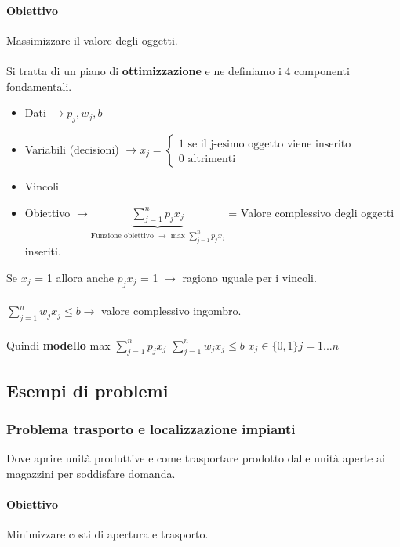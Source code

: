\documentclass[12pt, letterpaper]{article}
\begin{document}
	\paragraph{Obiettivo}Massimizzare il valore degli oggetti.
	\\\\Si tratta di un piano di \textbf{ottimizzazione} e ne definiamo i 4 componenti fondamentali.
	\\\begin{itemize}
		\item Dati $\rightarrow p_j, w_j, b$ 
		\item Variabili (decisioni) $\rightarrow x_j= \begin{cases} \text{1 se il j-esimo oggetto viene inserito} \\ \text{0 altrimenti}\end{cases}$
		\item Vincoli
		\item Obiettivo $\rightarrow \underbrace{\sum_{j=1}^n p_jx_j}_{\text{Funzione obiettivo $\rightarrow$ max $\sum_{j=1}^np_jx_j$}}$ = Valore complessivo degli oggetti inseriti.\\
	\end{itemize}
	Se $x_j$ = 1 allora anche $p_jx_j$ = 1 $\rightarrow$ ragiono uguale per i vincoli.\\\\
	$\sum_{j=1}^nw_jx_j \leq b \rightarrow$ valore complessivo ingombro.\\\\
	Quindi \textbf{modello} max $\sum_{j=1}^np_jx_j$ \hspace*{0.3cm} $\sum_{j=1}^nw_jx_j \leq b$ \hspace*{0.3cm} $x_j \in \{0,1\} j = 1...n$
	\subsection{Esempi di problemi}
	
		\subsubsection{Problema trasporto e localizzazione impianti}
			
			Dove aprire unità produttive e come trasportare prodotto dalle unità aperte ai magazzini per soddisfare domanda.
			
			\paragraph{Obiettivo}Minimizzare costi di apertura e trasporto.
			
\end{document}
